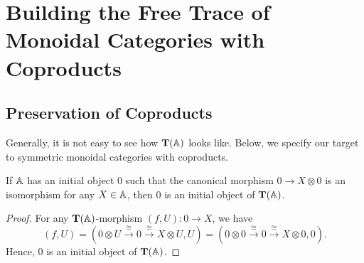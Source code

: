 \section{Building the Free Trace of Monoidal Categories with Coproducts}

\subsection{Preservation of Coproducts}

Generally, it is not easy to see how $\mathbf T(\mathbb{A})$ looks like. Below, we
specify our target to symmetric monoidal categories with coproducts.

\begin{lemma}\label{lem:zero-object}
  If $\mathbb{A}$ has an initial object $0$ such that the canonical morphism
  $0 \to X \otimes 0$ is an isomorphism for any $X \in \mathbb{A}$,
  then $0$ is an initial object of $\mathbf T(\mathbb{A})$.
\end{lemma}
\begin{proof}
  For any $\mathbf T(\mathbb{A})$-morphism $(f,U) \colon 0 \to X$, we have
  \begin{equation*}
    (f,U) = (0 \otimes U \xrightarrow{\cong}  0 \xrightarrow{\cong} X \otimes U,U)
    = (0 \otimes 0 \xrightarrow{\cong}  0 \xrightarrow{\cong} X \otimes 0,0).
  \end{equation*}
  Hence, $0$ is an initial object of $\mathbf T(\mathbb{A})$.
\end{proof}

